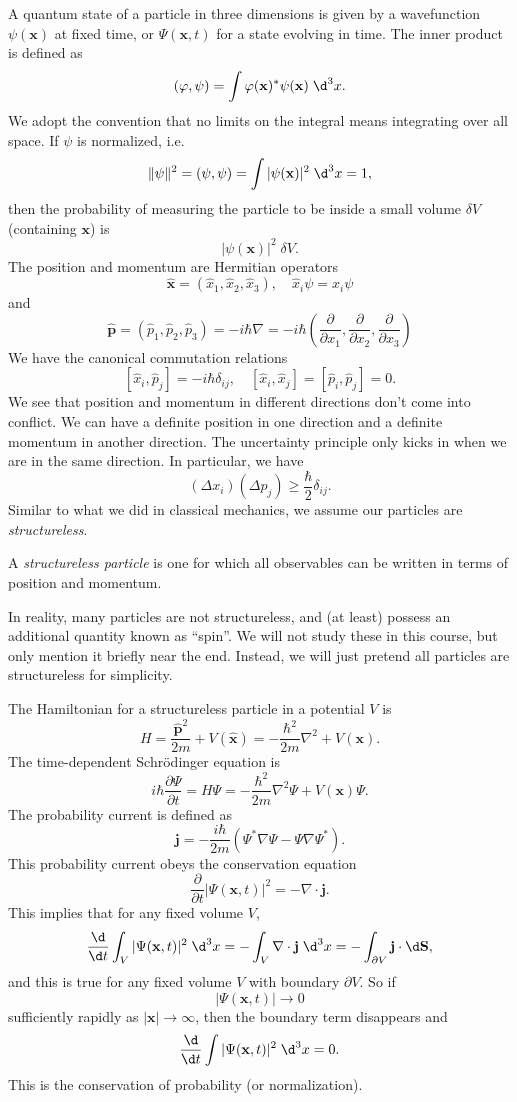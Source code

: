 \documentclass[a4paper]{article}
\begin{document}
A quantum state of a particle in three dimensions is given by a wavefunction $\psi(\mathbf{x})$ at fixed time, or $\Psi(\mathbf{x}, t)$ for a state evolving in time. The inner product is defined as
\[
  (\varphi, \psi) = \int \varphi(\mathbf{x})^* \psi(\mathbf{x})\;\d^3 x.
\]
We adopt the convention that no limits on the integral means integrating over all space. If $\psi$ is normalized, i.e.
\[
  \|\psi\|^2 = (\psi, \psi) = \int |\psi(\mathbf{x})|^2 \;\d^3 x = 1,
\]
then the probability of measuring the particle to be inside a small volume $\delta V$ (containing $\mathbf{x}$) is
\[
  |\psi(\mathbf{x})|^2\; \delta V.
\]
The position and momentum are Hermitian operators
\[
  \hat{\mathbf{x}} = (\hat{x}_1, \hat{x}_2, \hat{x}_3),\quad \hat{x}_i \psi = x_i \psi
\]
and
\[
  \hat{\mathbf{p}} = (\hat{p}_1, \hat{p}_2, \hat{p}_3) = -i\hbar \nabla = -i\hbar \left(\frac{\partial}{\partial x_1}, \frac{\partial}{\partial x_2}, \frac{\partial}{\partial x_3}\right)
\]
We have the canonical commutation relations
\[
  [\hat{x}_i, \hat{p}_j] = -i\hbar \delta_{ij},\quad [\hat{x}_i, \hat{x}_j] = [\hat{p}_i, \hat{p}_j] = 0.
\]
We see that position and momentum in different directions don't come into conflict. We can have a definite position in one direction and a definite momentum in another direction. The uncertainty principle only kicks in when we are in the same direction. In particular, we have
\[
  (\Delta x_i)(\Delta p_j) \geq \frac{\hbar}{2} \delta_{ij}.
\]
Similar to what we did in classical mechanics, we assume our particles are \emph{structureless}.
\begin{defi}
  A \emph{structureless particle} is one for which all observables can be written in terms of position and momentum.
\end{defi}
In reality, many particles are not structureless, and (at least) possess an additional quantity known as ``spin''. We will not study these in this course, but only mention it briefly near the end. Instead, we will just pretend all particles are structureless for simplicity.

The Hamiltonian for a structureless particle in a potential $V$ is
\[
  H = \frac{\hat{\mathbf{p}}^2}{2m} + V(\hat{\mathbf{x}}) = -\frac{\hbar^2}{2m} \nabla^2 + V(\mathbf{x}).
\]
The time-dependent Schr\"odinger equation is
\[
  i \hbar \frac{\partial \Psi}{\partial t} = H \Psi = -\frac{\hbar^2}{2m} \nabla^2\Psi + V(\mathbf{x})\Psi.
\]
The probability current is defined as
\[
  \mathbf{j} = -\frac{i\hbar}{2m} (\Psi^* \nabla \Psi - \Psi \nabla \Psi^*).
\]
This probability current obeys the conservation equation
\[
  \frac{\partial}{\partial t}|\Psi(\mathbf{x}, t)|^2 = -\nabla \cdot \mathbf{j}.
\]
This implies that for any fixed volume $V$,
\[
  \frac{\d}{\d t}\int_V |\Psi(\mathbf{x}, t)|^2 \;\d^3 x = -\int_V \nabla \cdot \mathbf{j}\;\d^3 x = -\int_{\partial V} \mathbf{j}\cdot \d \mathbf{S},
\]
and this is true for any fixed volume $V$ with boundary $\partial V$. So if
\[
  |\Psi(\mathbf{x}, t)| \to 0
\]
sufficiently rapidly as $|\mathbf{x}| \to \infty$, then the boundary term disappears and
\[
  \frac{\d}{\d t}\int |\Psi(\mathbf{x}, t)|^2 \;\d^3 x = 0.
\]
This is the conservation of probability (or normalization).
\end{document}
